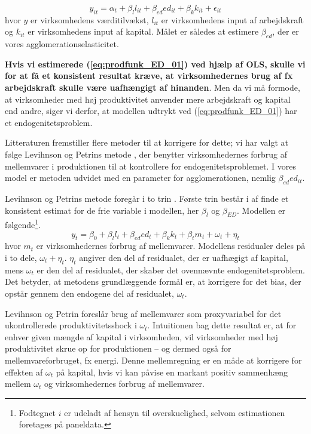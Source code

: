 \begin{equation}
	y_{it} = \alpha_t + \beta_l l_{it} + \beta_{ed} ed_{it} + \beta_{k} k_{it} + \epsilon_{it}
	\label{eq:prodfunk_ED_01}
\end{equation}
hvor $y$ er virksomhedens værditilvækst, $l_{it}$ er virksomhedens input af arbejdskraft og $k_{it}$ er virksomhedens input af kapital. Målet er således at estimere $\beta_{ed}$, der er vores agglomerationselasticitet.

\textbf{Hvis vi estimerede (\ref{eq:prodfunk_ED_01}) ved hjælp af OLS, skulle vi for at få et konsistent resultat kræve, at virksomhedernes brug af fx arbejdskraft skulle være uafhængigt af hinanden}. Men da vi må formode, at virksomheder med høj produktivitet anvender mere arbejdskraft og kapital end andre, siger vi derfor, at modellen udtrykt ved (\ref{eq:prodfunk_ED_01}) har et endogenitetsproblem.

Litteraturen fremstiller flere metoder til at korrigere for dette; vi har valgt at følge Levihnson og Petrins metode \cite{levinsohn2003estimating}, der benytter virksomhedernes forbrug af mellemvarer i produktionen til at kontrollere for endogenitetsproblemet. I vores model er metoden udvidet med en parameter for agglomerationen, nemlig $\beta_{ed} ed_{it}$.

Levihnson og Petrins metode foregår i to trin \cite[p. 115ff.]{petrin2004production}. Første trin består i af finde et konsistent estimat for de frie variable i modellen, her $\beta_l$ og $\beta_{ED}$. Modellen er følgende\footnote{Fodtegnet $i$ er udeladt af hensyn til overskuelighed, selvom estimationen foretages på paneldata.}.
\begin{equation}
	y_{t} = \beta_0 + \beta_l l_t+ \beta_{ed} ed_t +
	\beta_k k_t + \beta_t m_t + \omega_t + \eta_t
	\label{LP_01}
\end{equation}
hvor $m_t$ er virksomhedernes forbrug af mellemvarer. Modellens residualer deles på i to dele, $\omega_t + \eta_t$. $\eta_t$ angiver den del af residualet, der er uafhægigt af kapital, mens $\omega_t$ er den del af residualet, der skaber det ovennævnte endogenitetsproblem. Det betyder, at metodens grundlæggende formål er, at korrigere for det bias, der opstår gennem den endogene del af residualet, 
$\omega_t$.

Levihnson og Petrin foreslår brug af mellemvarer som proxyvariabel for det ukontrollerede produktivitetsshock i $\omega_t$. Intuitionen bag dette resultat er, at for enhver given mængde af kapital i virksomheden, vil virksomheder med høj produktivitet skrue op for produktionen -- og dermed også for mellemvareforbruget, fx energi. Denne mellemregning er en måde at korrigere for effekten af $\omega_t$ på kapital, hvis vi kan påvise en markant positiv sammenhæng mellem $\omega_t$ og virksomhedernes forbrug af mellemvarer.

